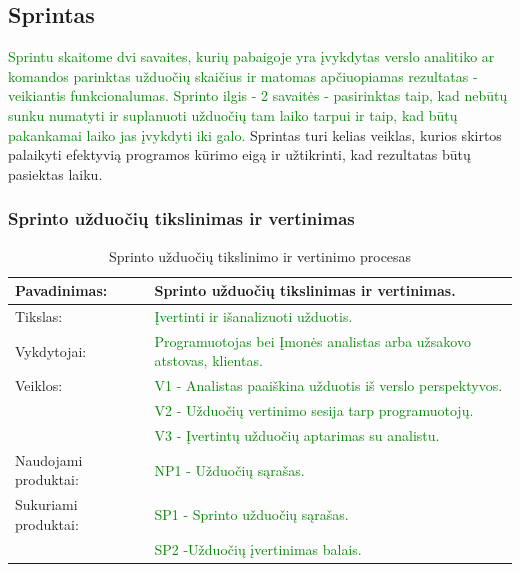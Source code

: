 \documentclass{VUMIFPSkursinis}
\begin{document}
	\subsection{Sprintas}
	\textcolor{green}{Sprintu skaitome dvi savaites, kurių pabaigoje yra įvykdytas verslo analitiko ar komandos parinktas užduočių skaičius ir matomas apčiuopiamas rezultatas - veikiantis funkcionalumas.
	Sprinto ilgis - 2 savaitės - pasirinktas taip, kad nebūtų sunku numatyti ir suplanuoti užduočių tam laiko tarpui ir taip, kad būtų pakankamai laiko jas įvykdyti iki galo.}
	Sprintas turi kelias veiklas, kurios skirtos palaikyti efektyvią programos kūrimo eigą ir užtikrinti, kad rezultatas būtų pasiektas laiku.

	\subsubsection{Sprinto užduočių tikslinimas ir vertinimas}
	\begin{center}
		\begin{table}[ht]
			\caption{Sprinto užduočių tikslinimo ir vertinimo procesas}
			\begin{tabular}{ | l | l | }
				\hline
				Pavadinimas:         & Sprinto užduočių tikslinimas ir vertinimas.				\\ \hline
				Tikslas:             & \textcolor{green}{Įvertinti ir išanalizuoti užduotis.}					\\ \hline
				Vykdytojai:          & \textcolor{green}{Programuotojas bei Įmonės analistas arba užsakovo atstovas, klientas.}	\\ \hline
				Veiklos:             & \textcolor{green}{V1 - Analistas paaiškina užduotis iš verslo perspektyvos. }		\\
				                     & \textcolor{green}{V2 - Užduočių vertinimo sesija tarp programuotojų.	}		\\
				                     & \textcolor{green}{V3 - Įvertintų užduočių aptarimas su analistu. }			\\ \hline
				Naudojami produktai: & \textcolor{green}{NP1 - Užduočių sąrašas. }						\\ \hline
				Sukuriami produktai: & \textcolor{green}{SP1 - Sprinto užduočių sąrašas.} 					\\
				                     & \textcolor{green}{SP2 -Užduočių įvertinimas balais.	}				\\ \hline
			\end{tabular}
		\end{table}
	\end{center}
\end{document}
